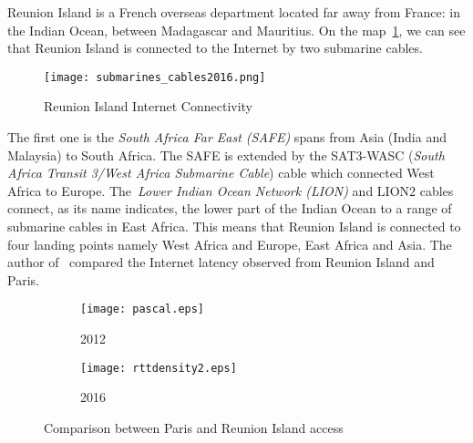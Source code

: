 \documentclass[10pt, conference, a4paper, twocolumns]{IEEEtran}
\def\rouge#1{\textcolor{red}{#1}}
\def\yassine#1{\textbf{\textcolor{blue}{yassine : #1}}}
\begin{document}
Reunion Island is a French overseas department located far away from France: in the Indian Ocean, between Madagascar and Mauritius. 
On the map~\ref{map:cables}, we can see that Reunion Island is connected to the Internet by two submarine cables. 
\begin{figure}[ht!]
\centering
\texttt{[image: submarines\_cables2016.png]}
\caption{Reunion Island Internet Connectivity}
\label{map:cables}
\end{figure}
The first one is the \emph{South Africa Far East (SAFE)} spans from Asia (India and Malaysia) to South Africa. The SAFE is extended by the SAT3-WASC (\emph{South Africa Transit 3/West Africa Submarine Cable}) cable which connected West Africa to Europe. The~\emph{Lower Indian Ocean Network (LION)} and LION2 cables connect, as its name indicates, the lower part of the Indian Ocean to a range of submarine cables in East Africa. This means that Reunion Island is connected to four landing points namely West Africa and Europe, East Africa and Asia.
The author of~\cite{Anelli2012} compared the Internet latency observed from Reunion Island and Paris. 
\begin{figure*}[ht!]
	\begin{subfigure}[h]{\columnwidth}
		\texttt{[image: pascal.eps]}
		\caption{2012}
		\label{curve:2012}
  \end{subfigure}
  \hfill
  \begin{subfigure}[h]{\columnwidth}
  	\texttt{[image: rttdensity2.eps]}
		\caption{2016}
		\label{curve:2016}
  \end{subfigure}
  \caption{Comparison between Paris and Reunion Island access}
  \label{curve:ping}
\end{figure*}
\end{document}
